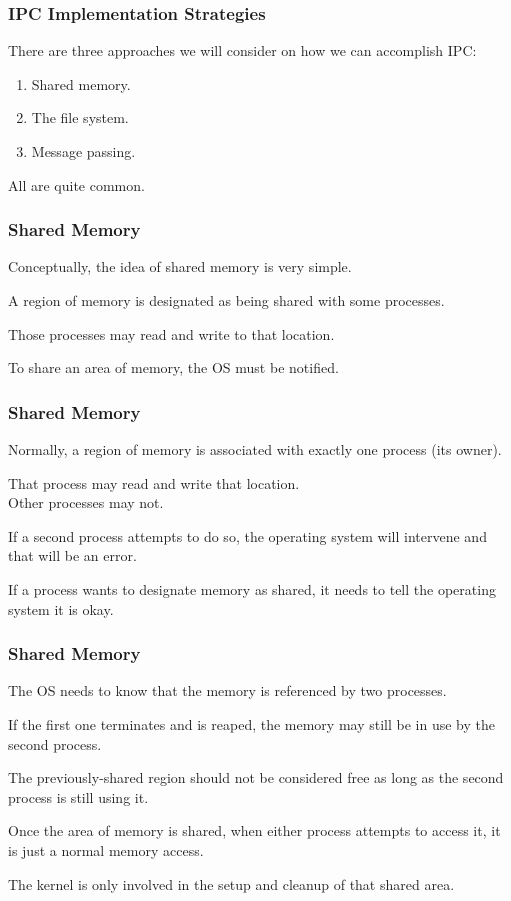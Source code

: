 \begin{frame}
\frametitle{IPC Implementation Strategies}

There are three approaches we will consider on how we can accomplish IPC:
\begin{enumerate}
	\item Shared memory.
	\item The file system.
	\item Message passing.
\end{enumerate}

All are quite common.

\end{frame}

\begin{frame}
\frametitle{Shared Memory}

Conceptually, the idea of shared memory is very simple. 

A region of memory is designated as being shared with some processes.

Those processes may read and write to that location. 

To share an area of memory, the OS must be notified.

\end{frame}

\begin{frame}
\frametitle{Shared Memory}
Normally, a region of memory is associated with exactly one process (its owner).

That process may read and write that location.\\
\quad Other processes may not. 

If a second process attempts to do so, the operating system will intervene and that will be an error.

 If a process wants to designate memory as shared, it needs to tell the operating system it is okay.

\end{frame}

\begin{frame}
\frametitle{Shared Memory}

The OS needs to know that the memory is referenced by two processes.

If the first one terminates and is reaped, the memory may still be in use by the second process.

The previously-shared region should not be considered free as long as the second process is still using it. 

Once the area of memory is shared, when either process attempts to access it, it is just a normal memory access. 

The kernel is only involved in the setup and cleanup of that shared area.

\end{frame}

